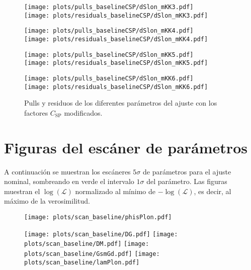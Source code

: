 \begin{subappendices}
\begin{figure}[H] 
  \centering
  \begin{multicols}{2}
  \texttt{[image: plots/pulls\_baselineCSP/dSlon\_mKK3.pdf]}  \\
  \texttt{[image: plots/residuals\_baselineCSP/dSlon\_mKK3.pdf]}
  \end{multicols}  
  \begin{multicols}{2}
  \texttt{[image: plots/pulls\_baselineCSP/dSlon\_mKK4.pdf]}  \\
  \texttt{[image: plots/residuals\_baselineCSP/dSlon\_mKK4.pdf]}
  \end{multicols}  
  \begin{multicols}{2}
  \texttt{[image: plots/pulls\_baselineCSP/dSlon\_mKK5.pdf]}  \\
  \texttt{[image: plots/residuals\_baselineCSP/dSlon\_mKK5.pdf]}
  \end{multicols}  
  \begin{multicols}{2}
  \texttt{[image: plots/pulls\_baselineCSP/dSlon\_mKK6.pdf]}  \\
  \texttt{[image: plots/residuals\_baselineCSP/dSlon\_mKK6.pdf]}
  \end{multicols}    
\caption{Pulls y residuos de los diferentes parámetros del ajuste con  los factores $C_{\text{SP}}$ modificados.} \label{fig:systecsp}
\end{figure}



\section{Figuras del escáner de parámetros}

A continuación se muestran los escáneres $5\sigma$ de parámetros para el ajuste nominal, sombreando en verde el intervalo $1\sigma$ del parámetro.
Las figuras muestran el $\log(\mathcal{L})$ normalizado al mínimo de $-\log(\mathcal{L})$, es decir, al máximo de la verosimilitud.

\begin{figure}[H]
  \centering
  \texttt{[image: plots/scan\_baseline/phisPlon.pdf]}
  \begin{multicols}{2}
  \texttt{[image: plots/scan\_baseline/DG.pdf]}  
  \texttt{[image: plots/scan\_baseline/DM.pdf]}  
  \texttt{[image: plots/scan\_baseline/GsmGd.pdf]}    
  \texttt{[image: plots/scan\_baseline/lamPlon.pdf]}  
  \end{multicols}
\end{figure}
\newpage


\end{subappendices}
